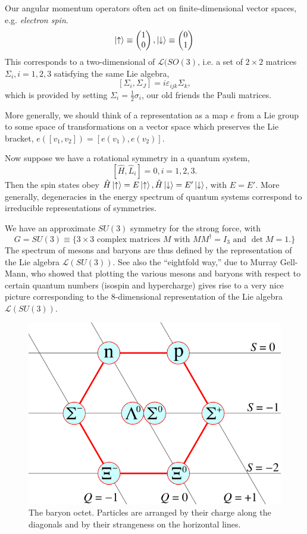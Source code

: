 Our angular momentum operators often act on finite-dimensional vector spaces, e.g. \emph{electron spin}.
$$\left| \uparrow \right>\equiv \begin{pmatrix}1\\0\end{pmatrix},\left| \downarrow \right>\equiv \begin{pmatrix}0\\1\end{pmatrix}$$
This corresponds to a two-dimensional  of $\mathcal{L}(SO(3)$, i.e. a set of $2\times 2$ matrices $\Sigma_i, i=1,2,3$ satisfying the same Lie algebra,
$$[\Sigma_i,\Sigma_J]=i\varepsilon_{ijk}\Sigma_k,$$
which is provided by setting $\Sigma_i=\frac{1}{2}\sigma_i$, our old friends the Pauli matrices.

More generally, we should think of a representation as a map $e$ from a Lie group to some space of transformations on a vector space which preserves the Lie bracket, $e([v_1,v_2])=[e(v_1),e(v_2)]$.

Now suppose we have a rotational symmetry in a quantum system, $$[\hat H, \hat L_i]=0,i=1,2,3.$$ Then the spin states obey $\hat H\left| \uparrow \right>=E\left| \uparrow \right>, \hat H\left| \downarrow \right>= E' \left| \downarrow \right>$, with $E=E'$. More generally, degeneracies in the energy spectrum of quantum systems correspond to irreducible representations of symmetries.

\begin{exm}
We have an approximate $SU(3)$ symmetry for the strong force, with
$$G=SU(3)\equiv \{3\times 3 \text{ complex matrices } M \text{ with } M M^\dagger = I_3 \text{ and } \det M = 1.\}$$
The spectrum of mesons and baryons are thus defined by the representation of the Lie algebra $\mathcal{L}(SU(3))$. See also the ``eightfold way,'' due to Murray Gell-Mann, who showed that plotting the various mesons and baryons with respect to certain quantum numbers (isospin and hypercharge) gives rise to a very nice picture corresponding to the 8-dimensional representation of the Lie algebra $\mathcal{L}(SU(3)).$
\end{exm}

\begin{figure}
\includegraphics[scale=0.4]{2018/10/20181004_baryonoctet}
\caption{The baryon octet. Particles are arranged by their charge along the diagonals and by their strangeness on the horizontal lines.}
\end{figure}